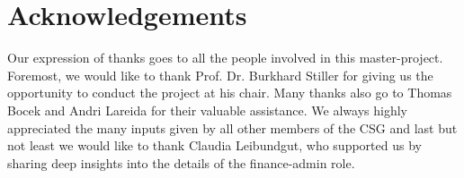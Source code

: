 \chapter*{Acknowledgements}

Our expression of thanks goes to all the people involved in this master-project. Foremost, we would like to thank Prof. Dr. Burkhard Stiller for giving us the opportunity to conduct the project at his chair. Many thanks also go to Thomas Bocek and Andri Lareida for their valuable assistance. We always highly appreciated the many inputs given by all other members of the CSG and last but not least we would like to thank Claudia Leibundgut, who supported us by sharing deep insights into the details of the finance-admin role.